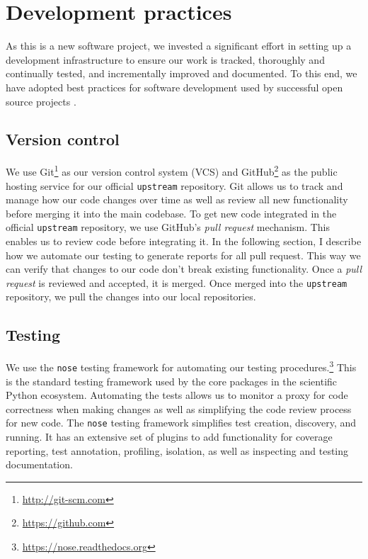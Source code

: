 \chapter{\label{ch:dev}Development practices}

As this is a new software project, we invested a significant effort in setting
up a development infrastructure to ensure our work is tracked,
thoroughly and continually tested, and incrementally improved and documented.
To this end, we have adopted best practices for software development used by
successful open source projects \cite{millman2014}.

\section{\label{sec:vc}Version control}

We use Git\footnote{\url{http://git-scm.com}} as our version control system
(VCS) and GitHub\footnote{\url{https://github.com}} as the public hosting
service for our official \texttt{upstream} repository.  Git allows us to track
and manage how our code changes over time as well as review all new
functionality before merging it into the main codebase.  To get new code
integrated in the official \texttt{upstream} repository, we use GitHub's
\emph{pull request} mechanism.  This enables us to review code before
integrating it.  In the following section, I describe how we automate our
testing to generate reports for all pull request.  This way we can verify that
changes to our code don't break existing functionality.  Once a \emph{pull
request} is reviewed and accepted, it is merged.  Once merged into the
\texttt{upstream} repository, we pull the changes into our local repositories.


\section{\label{sec:test}Testing}

We use the \texttt{nose} testing framework for automating our testing
procedures.\footnote{\url{https://nose.readthedocs.org}}  This is the standard
testing framework used by the core packages in the scientific Python ecosystem.
Automating the tests allows us to monitor a proxy for code correctness when
making changes as well as simplifying the code review process for new code. 
The \texttt{nose} testing framework simplifies test creation, discovery,
and running. It has an extensive set of plugins to add functionality
for coverage reporting, test annotation, profiling, isolation, as well
as inspecting and testing documentation.


